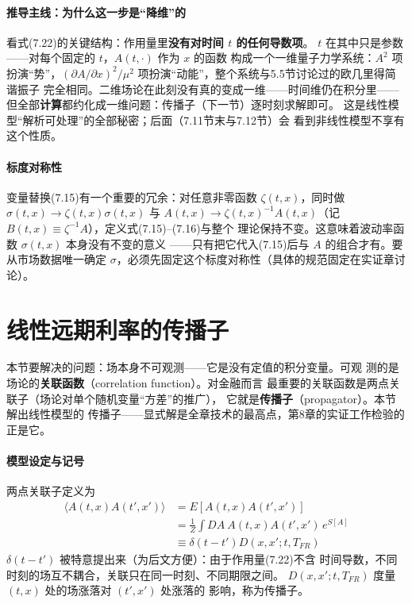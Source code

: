 \paragraph{推导主线：为什么这一步是“降维”的}
看式(7.22)的关键结构：作用量里\textbf{没有对时间 $t$ 的任何导数项}。
$t$ 在其中只是参数——对每个固定的 $t$，$A(t,\cdot)$ 作为 $x$ 的函数
构成一个一维量子力学系统：$A^2$ 项扮演“势”，$(\partial A/\partial
x)^2/\mu^2$ 项扮演“动能”，整个系统与5.5节讨论过的欧几里得简谐振子
完全相同。二维场论在此刻没有真的变成一维——时间维仍在积分里——
但全部\textbf{计算}都约化成一维问题：传播子（下一节）逐时刻求解即可。
这是线性模型“解析可处理”的全部秘密；后面（7.11节末与7.12节）会
看到非线性模型不享有这个性质。

\paragraph{标度对称性}
变量替换(7.15)有一个重要的冗余：对任意非零函数 $\zeta(t,x)$，同时做
$\sigma(t,x)\to\zeta(t,x)\sigma(t,x)$ 与 $A(t,x)\to\zeta(t,x)^{-1}
A(t,x)$（记 $B(t,x)\equiv\zeta^{-1}A$），定义式(7.15)--(7.16)与整个
理论保持不变。这意味着波动率函数 $\sigma(t,x)$ 本身没有不变的意义
——只有把它代入(7.15)后与 $A$ 的组合才有。要从市场数据唯一确定
$\sigma$，必须先固定这个标度对称性（具体的规范固定在实证章讨论）。

\section{线性远期利率的传播子}

本节要解决的问题：场本身不可观测——它是没有定值的积分变量。可观
测的是场论的\textbf{关联函数}（correlation function）。对金融而言
最重要的关联函数是两点关联子（场论对单个随机变量“方差”的推广），
它就是\textbf{传播子}（propagator）。本节解出线性模型的
传播子——显式解是全章技术的最高点，第8章的实证工作检验的正是它。

\paragraph{模型设定与记号}
两点关联子定义为
\begin{align*}
\langle A(t,x)A(t',x')\rangle&=E[A(t,x)A(t',x')]\\
&=\frac{1}{Z}\int DA\ A(t,x)A(t',x')\,e^{S[A]}\\
&\equiv\delta(t-t')D(x,x';t,T_{FR})
\tag{7.23}
\end{align*}
$\delta(t-t')$ 被特意提出来（为后文方便）：由于作用量(7.22)不含
时间导数，不同时刻的场互不耦合，关联只在同一时刻、不同期限之间。
$D(x,x';t,T_{FR})$ 度量 $(t,x)$ 处的场涨落对 $(t',x')$ 处涨落的
影响，称为传播子。

